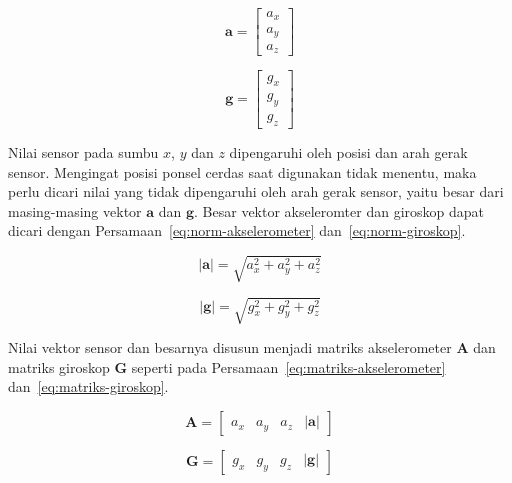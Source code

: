 \begin{equation}
    \label{eq:vektor-akselerometer}
    \pmb{a} = 
    \begin{bmatrix}
        a_x \\
        a_y \\
        a_z
    \end{bmatrix}
\end{equation}

\begin{equation}
    \label{eq:vektor-giroskop}
    \pmb{g} = 
    \begin{bmatrix}
        g_x \\
        g_y \\
        g_z
    \end{bmatrix}
\end{equation}

Nilai sensor pada sumbu $x$, $y$ dan $z$ dipengaruhi oleh posisi dan arah gerak sensor. Mengingat posisi ponsel cerdas saat digunakan tidak menentu, maka perlu dicari nilai yang tidak dipengaruhi oleh arah gerak sensor, yaitu besar dari masing-masing vektor $\pmb{a}$ dan $\pmb{g}$. Besar vektor akseleromter dan giroskop dapat dicari dengan Persamaan~\ref{eq:norm-akselerometer} dan~\ref{eq:norm-giroskop}.

\begin{equation}
    \label{eq:norm-akselerometer}
    |\pmb{a}| = \sqrt{a_x^2 + a_y^2 + a_z^2}
\end{equation}

\begin{equation}
    \label{eq:norm-giroskop}
    |\pmb{g}| = \sqrt{g_x^2 + g_y^2 + g_z^2}
\end{equation}

Nilai vektor sensor dan besarnya disusun menjadi matriks akselerometer $\pmb{A}$ dan matriks giroskop $\pmb{G}$ seperti pada Persamaan~\ref{eq:matriks-akselerometer} dan~\ref{eq:matriks-giroskop}.

\begin{equation}
    \label{eq:matriks-akselerometer}
    \pmb{A} = 
    \begin{bmatrix}
        a_x & a_y & a_z & |\pmb{a}|
    \end{bmatrix}
\end{equation}

\begin{equation}
    \label{eq:matriks-giroskop}
    \pmb{G} = 
    \begin{bmatrix}
        g_x & g_y & g_z & |\pmb{g}|
    \end{bmatrix}
\end{equation}

